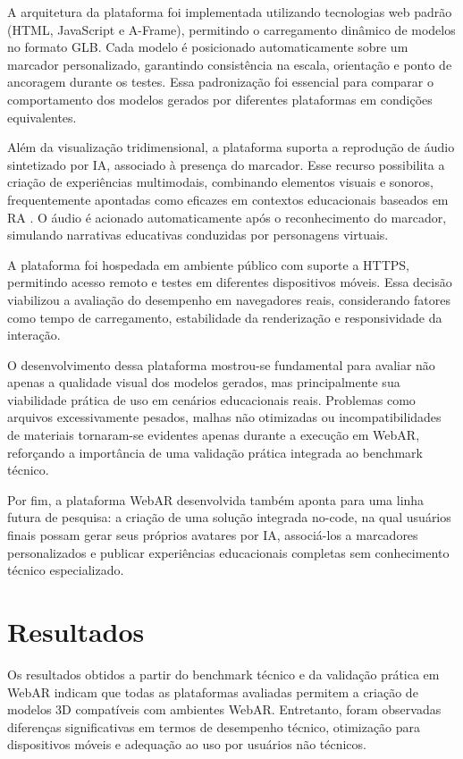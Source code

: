 \documentclass[conference]{IEEEtran}
\begin{document}
A arquitetura da plataforma foi implementada utilizando tecnologias web padrão (HTML, JavaScript e A-Frame), permitindo o carregamento dinâmico de modelos no formato GLB. Cada modelo é posicionado automaticamente sobre um marcador personalizado, garantindo consistência na escala, orientação e ponto de ancoragem durante os testes. Essa padronização foi essencial para comparar o comportamento dos modelos gerados por diferentes plataformas em condições equivalentes.

Além da visualização tridimensional, a plataforma suporta a reprodução de áudio sintetizado por IA, associado à presença do marcador. Esse recurso possibilita a criação de experiências multimodais, combinando elementos visuais e sonoros, frequentemente apontadas como eficazes em contextos educacionais baseados em RA \cite{fonnet2021review}. O áudio é acionado automaticamente após o reconhecimento do marcador, simulando narrativas educativas conduzidas por personagens virtuais.

A plataforma foi hospedada em ambiente público com suporte a HTTPS, permitindo acesso remoto e testes em diferentes dispositivos móveis. Essa decisão viabilizou a avaliação do desempenho em navegadores reais, considerando fatores como tempo de carregamento, estabilidade da renderização e responsividade da interação.

O desenvolvimento dessa plataforma mostrou-se fundamental para avaliar não apenas a qualidade visual dos modelos gerados, mas principalmente sua viabilidade prática de uso em cenários educacionais reais. Problemas como arquivos excessivamente pesados, malhas não otimizadas ou incompatibilidades de materiais tornaram-se evidentes apenas durante a execução em WebAR, reforçando a importância de uma validação prática integrada ao benchmark técnico.

Por fim, a plataforma WebAR desenvolvida também aponta para uma linha futura de pesquisa: a criação de uma solução integrada no-code, na qual usuários finais possam gerar seus próprios avatares por IA, associá-los a marcadores personalizados e publicar experiências educacionais completas sem conhecimento técnico especializado.


\section{Resultados}

Os resultados obtidos a partir do benchmark técnico e da validação prática em WebAR indicam que todas as plataformas avaliadas permitem a criação de modelos 3D compatíveis com ambientes WebAR. Entretanto, foram observadas diferenças significativas em termos de desempenho técnico, otimização para dispositivos móveis e adequação ao uso por usuários não técnicos.
\end{document}
